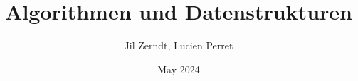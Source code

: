 \documentclass[a4paper, fontsize = 8pt, landscape]{scrartcl}
\title{Algorithmen und Datenstrukturen}
\author{Jil Zerndt, Lucien Perret}
\date{May 2024}
\begin{document}
\begin{multicols}{3}
	\thispagestyle{TitlePageStyle}
	\maketitle
	
	
	
	
	
	
	
	
	
	
	
	
	\raggedcolumns
	\pagebreak
	
\end{multicols}
\end{document}
